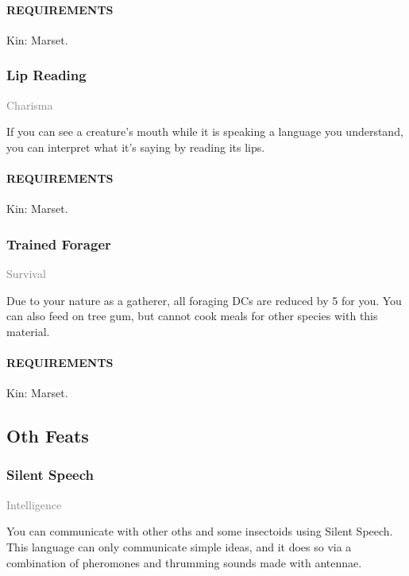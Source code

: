     \paragraph{REQUIREMENTS} Kin: Marset.

    \subsubsection{Lip Reading} \label{feat::lipreading}
    \small{\textcolor{gray}{Charisma}}

    \normalsize
    If you can see a creature's mouth while it is speaking a language you understand, you can interpret what it's saying by reading its lips.
    \paragraph{REQUIREMENTS} Kin: Marset.

    \subsubsection{Trained Forager} \label{feat::trainedforager}
    \small{\textcolor{gray}{Survival}}

    \normalsize
    Due to your nature as a gatherer, all foraging DCs are reduced by 5 for you.
    You can also feed on tree gum, but cannot cook meals for other species with this material.
    \paragraph{REQUIREMENTS} Kin: Marset.

\subsection*{Oth Feats}
    \subsubsection{Silent Speech} \label{feat::silentspeech}
    \small{\textcolor{gray}{Intelligence}}

    \normalsize
    You can communicate with other oths and some insectoids using Silent Speech.
    This language can only communicate simple ideas, and it does so via a combination of pheromones and thrumming sounds made with antennae.
